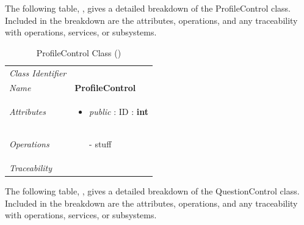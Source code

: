 \documentclass[12pt,letterpaper]{article}
\begin{document}
The following table, , gives a detailed breakdown of the ProfileControl class. Included in the breakdown are the attributes, operations, and any traceability with operations, services, or subsystems.

\begin{table}[H]
    \caption{ProfileControl Class ()} 
	\begin{tabu} to 
		\toprule
		Class Identifier &  \\
		Name & {\bf ProfileControl} \\
		Attributes & 
		\begin{minipage}[t]{\linewidth}
		    \begin{itemize}
		        \item \textit{public} : ID : \bf{int}
			\end{itemize}
	    \end{minipage} \\

		Operations &
		\begin{minipage}[t]{\linewidth}
			\begin{enumerate}
			    \item[-] stuff
	        \end{enumerate}
	    \end{minipage} \\
	    	Traceability & \\
		\toprule
	\end{tabu}
\end{table}

The following table, , gives a detailed breakdown of the QuestionControl class. Included in the breakdown are the attributes, operations, and any traceability with operations, services, or subsystems.
\end{document}
